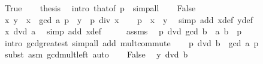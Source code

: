 \begin{isabellebody}
\ True\isanewline
\ \ \isamarkupfalse%
\ {\isacharquery}{\kern0pt}thesis\ \isamarkupfalse%
\ {\isacharparenleft}{\kern0pt}intro\ that{\isacharbrackleft}{\kern0pt}of\ p\ {}{\isacharbrackright}{\kern0pt}{\isacharparenright}{\kern0pt}\ simp{\isacharunderscore}{\kern0pt}all\isanewline
{}\isamarkupfalse%
\isanewline
\ \ \isamarkupfalse%
\ False\isanewline
\ \ \isamarkupfalse%
\ x\ y\ \ {\isachardoublequoteopen}x\ {\isacharequal}{\kern0pt}\ gcd\ a\ p{\isachardoublequoteclose}\ \ {\isachardoublequoteopen}y\ {\isacharequal}{\kern0pt}\ p\ div\ x{\isachardoublequoteclose}\isanewline
\ \ \isamarkupfalse%
\ {\isachardoublequoteopen}p\ {\isacharequal}{\kern0pt}\ x\ {\isacharasterisk}{\kern0pt}\ y{\isachardoublequoteclose}\ \isamarkupfalse%
\ {\isacharparenleft}{\kern0pt}simp\ add{\isacharcolon}{\kern0pt}\ x{\isacharunderscore}{\kern0pt}def\ y{\isacharunderscore}{\kern0pt}def{\isacharparenright}{\kern0pt}\isanewline
\ \ \isamarkupfalse%
\ \isamarkupfalse%
\ {\isachardoublequoteopen}x\ dvd\ a{\isachardoublequoteclose}\ \isamarkupfalse%
\ {\isacharparenleft}{\kern0pt}simp\ add{\isacharcolon}{\kern0pt}\ x{\isacharunderscore}{\kern0pt}def{\isacharparenright}{\kern0pt}\isanewline
\ \ \isamarkupfalse%
\ \isamarkupfalse%
\ assms\ \isamarkupfalse%
\ {\isachardoublequoteopen}p\ dvd\ gcd\ {\isacharparenleft}{\kern0pt}b\ {\isacharasterisk}{\kern0pt}\ a{\isacharparenright}{\kern0pt}\ {\isacharparenleft}{\kern0pt}b\ {\isacharasterisk}{\kern0pt}\ p{\isacharparenright}{\kern0pt}{\isachardoublequoteclose}\isanewline
\ \ \ \ \isamarkupfalse%
\ {\isacharparenleft}{\kern0pt}intro\ gcd{\isacharunderscore}{\kern0pt}greatest{\isacharparenright}{\kern0pt}\ {\isacharparenleft}{\kern0pt}simp{\isacharunderscore}{\kern0pt}all\ add{\isacharcolon}{\kern0pt}\ mult{\isachardot}{\kern0pt}commute{\isacharparenright}{\kern0pt}\isanewline
\ \ \isamarkupfalse%
\ {\isachardoublequoteopen}p\ dvd\ b\ {\isacharasterisk}{\kern0pt}\ gcd\ a\ p{\isachardoublequoteclose}\ \isamarkupfalse%
\ {\isacharparenleft}{\kern0pt}subst\ {\isacharparenleft}{\kern0pt}asm{\isacharparenright}{\kern0pt}\ gcd{\isacharunderscore}{\kern0pt}mult{\isacharunderscore}{\kern0pt}left{\isacharparenright}{\kern0pt}\ auto\isanewline
\ \ \isamarkupfalse%
\ False\ \isamarkupfalse%
\ {\isachardoublequoteopen}y\ dvd\ b{\isachardoublequoteclose}\isanewline

\end{isabellebody}

